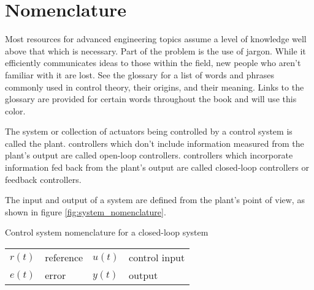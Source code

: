 \section{Nomenclature}

Most resources for advanced engineering topics assume a level of knowledge well
above that which is necessary. Part of the problem is the use of jargon. While
it efficiently communicates ideas to those within the field, new people who
aren't familiar with it are lost. See the glossary for a list of words and
phrases commonly used in control theory, their origins, and their meaning. Links
to the glossary are provided for certain words throughout the book and will use
\textcolor{glscolor}{this color}.

The \gls{system} or collection of actuators being controlled by a
\gls{control system} is called the \gls{plant}. \Glspl{controller} which don't
include information measured from the \gls{plant}'s \gls{output} are called
open-loop \glspl{controller}. \Glspl{controller} which incorporate information
fed back from the \gls{plant}'s \gls{output} are called closed-loop
\glspl{controller} or feedback \glspl{controller}.

The \gls{input} and \gls{output} of a \gls{system} are defined from the
\gls{plant}'s point of view, as shown in figure \ref{fig:system_nomenclature}.

\begin{bookfigure}

  \caption{Control system nomenclature for a closed-loop system}
  \label{fig:system_nomenclature}

  \begin{figurekey}
    \begin{tabular}{llll}
      $r(t)$ & \gls{reference} & $u(t)$ & \gls{control input} \\
      $e(t)$ & \gls{error} & $y(t)$ & \gls{output} \\
    \end{tabular}
  \end{figurekey}
\end{bookfigure}
